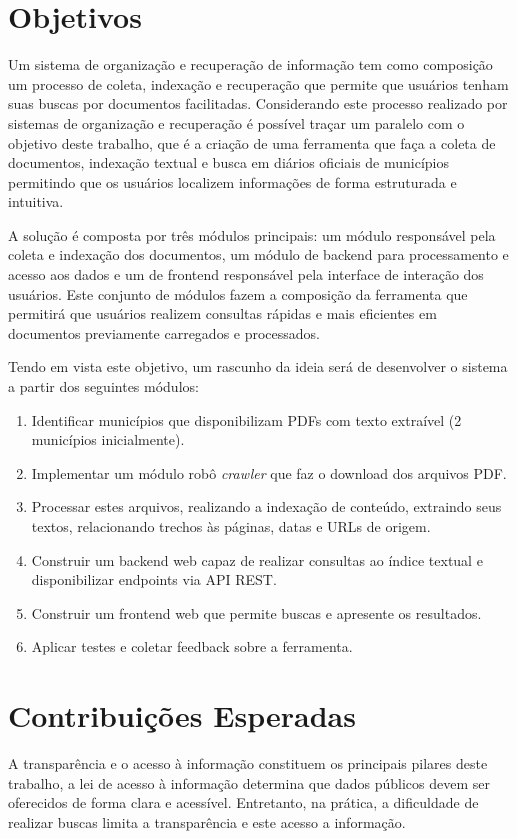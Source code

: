 \section{Objetivos}
Um sistema de organização e recuperação de informação tem como composição um processo de coleta, indexação e recuperação \cite{Baeza-Yates2013} que permite que usuários tenham suas buscas por documentos facilitadas.
Considerando este processo realizado por sistemas de organização e recuperação é possível traçar um paralelo com o objetivo deste trabalho, que é a criação de uma ferramenta que faça a coleta de documentos, indexação textual e busca em diários oficiais de municípios permitindo que os usuários localizem informações de forma estruturada e intuitiva.

A solução é composta por três módulos principais: um módulo responsável pela coleta e indexação dos documentos, um módulo de backend para processamento e acesso aos dados e um de frontend responsável pela interface de interação dos usuários. Este conjunto de módulos fazem a composição da ferramenta que permitirá que usuários realizem consultas rápidas e mais eficientes em documentos previamente carregados e processados.

Tendo em vista este objetivo, um rascunho da ideia será de desenvolver o sistema a partir dos seguintes módulos:

\begin{enumerate}
    \item Identificar municípios que disponibilizam PDFs com texto extraível (2 municípios inicialmente).
    \item Implementar um módulo robô \textit{crawler} que faz o download dos arquivos PDF.
    \item Processar estes arquivos, realizando a indexação de conteúdo, extraindo seus textos, relacionando trechos às páginas, datas e URLs de origem.
    \item Construir um backend web capaz de realizar consultas ao índice textual e disponibilizar endpoints via API REST.
    \item Construir um frontend web que permite buscas e apresente os resultados.
    \item Aplicar testes e coletar feedback sobre a ferramenta.
\end{enumerate}

\section{Contribuições Esperadas}
A transparência e o acesso à informação constituem os principais pilares deste trabalho, a lei de acesso à informação \cite{Lei:12527:2011} determina que dados públicos devem ser oferecidos de forma clara e acessível. Entretanto, na prática, a dificuldade de realizar buscas limita a transparência e este acesso a informação.

